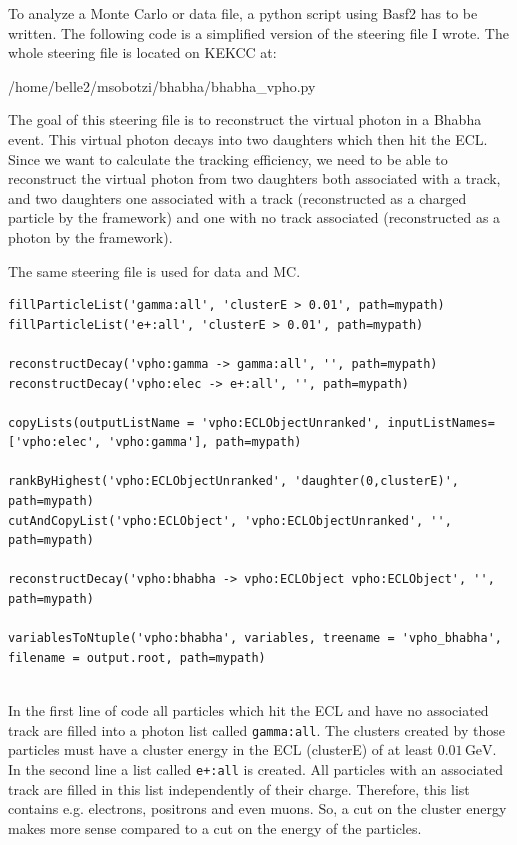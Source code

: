 \documentclass[a4paper,11pt,twosided,final,german,openbib,pdftex,listof=totoc,bibliography=totoc]{scrbook}
\begin{document}
To analyze a Monte Carlo or data file, a python script using Basf2 has to be written. The following code is a simplified version of the steering file I wrote. 
The whole steering file is located on KEKCC at:


/home/belle2/msobotzi/bhabha/bhabha\_vpho.py
\newline


The goal of this steering file is to reconstruct the virtual photon in a Bhabha event. This virtual photon decays into two daughters which then hit the ECL. Since we want to calculate the tracking efficiency, we need to be able to reconstruct the virtual photon from two daughters both associated with a track, and two daughters one associated with a track (reconstructed as a charged particle by the framework) and one with no track associated (reconstructed as a photon by the framework).

The same steering file is used for data and MC.
\newline 


{
\begin{lstlisting}
fillParticleList('gamma:all', 'clusterE > 0.01', path=mypath)
fillParticleList('e+:all', 'clusterE > 0.01', path=mypath)

reconstructDecay('vpho:gamma -> gamma:all', '', path=mypath)
reconstructDecay('vpho:elec -> e+:all', '', path=mypath)

copyLists(outputListName = 'vpho:ECLObjectUnranked', inputListNames=['vpho:elec', 'vpho:gamma'], path=mypath)

rankByHighest('vpho:ECLObjectUnranked', 'daughter(0,clusterE)', path=mypath)
cutAndCopyList('vpho:ECLObject', 'vpho:ECLObjectUnranked', '', path=mypath)
	
reconstructDecay('vpho:bhabha -> vpho:ECLObject vpho:ECLObject', '', path=mypath)

variablesToNtuple('vpho:bhabha', variables, treename = 'vpho_bhabha', filename = output.root, path=mypath)
	
\end{lstlisting}
}
\bigskip


In the first line of code all particles which hit the ECL and have no associated track are filled into a photon list called \texttt{gamma:all}. The clusters created by those particles must have a cluster energy in the ECL (clusterE) of at least $0.01\,\textrm{GeV}$. In the second line a list called \texttt{e+:all} is created. All particles with an associated track are filled in this list independently of their charge. Therefore, this list contains e.g. electrons, positrons and even muons. So, a cut on the cluster energy makes more sense compared to a cut on the energy of the particles.
\end{document}
